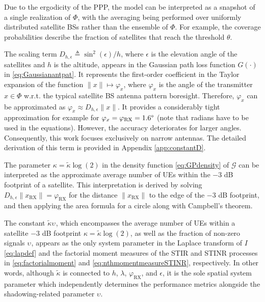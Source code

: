 \documentclass[lettersize,journal]{IEEEtran}
\begin{document}
Due to the ergodicity of the PPP, the model can be interpreted as a snapshot of a single realization of $\Phi$, with the averaging being performed over uniformly distributed satellite BSs rather than the ensemble of $\Phi$. For example, the coverage probabilities describe the fraction of satellites that reach the threshold $\theta$.


The scaling term $D_{h,\epsilon} \triangleq {\sin^2(\epsilon)}/{h}$, where $\epsilon$ is the elevation angle of the satellites and $h$ is the altitude, appears in the Gaussian path loss function $G(\cdot)$ in \eqref{eq:Gaussianantpat}. It represents the first-order coefficient in the Taylor expansion of the function $\|x\| \mapsto \varphi_x$, where $\varphi_x$ is the angle of the transmitter \( x \in \Phi \) w.r.t. the typical satellite BS antenna pattern boresight. Therefore, $\varphi_x$ can be approximated as $\varphi_x \approx D_{h,\epsilon} \|x\|$. It provides a considerably tight approximation for example for $\varphi_x=\varphi_{\text{RX}}=1.6 \degree$ (note that radians have to be used in the equations). However, the accuracy deteriorates for larger angles. Consequently, this work focuses exclusively on narrow antennas. The detailed derivation of this term is provided in Appendix \ref{app:constantD}.






The parameter $\kappa=\tilde{\kappa} \log(2)$ in the density function \eqref{eq:GPdensity} of $\mathcal{G}$ can be interpreted as the approximate average number of UEs within the $-3$ dB footprint of a satellite. This interpretation is derived by solving $D_{h,\epsilon}\|x_{\text{RX}}\| = \varphi_{\text{RX}}$ for the distance $\|x_{\text{RX}}\|$ to the edge of the $-3$ dB footprint, and then applying the area formula for a circle along with Campbell's theorem.


The constant $\tilde{\kappa} \upsilon_{}$, which encompasses the average number of UEs within a satellite $-3$ dB footprint $\kappa= \tilde{\kappa}\log(2)$, as well as the fraction of non-zero signals $\upsilon_{}$, appears as the only system parameter in the Laplace transform of $I$ \eqref{eq:lapdef} and the factorial moment measures of the STIR and STINR processes in \eqref{eq:factorialmoment} and \eqref{eq:nthmomentmeasureSTINR}, respectively. In other words, although $\tilde{\kappa}$ is connected to $h$, $\lambda$, $\varphi_{\text{RX}}$, and $\epsilon$, it is the sole spatial system parameter which independently determines the performance metrics alongside the shadowing-related parameter $\upsilon$.
\end{document}
